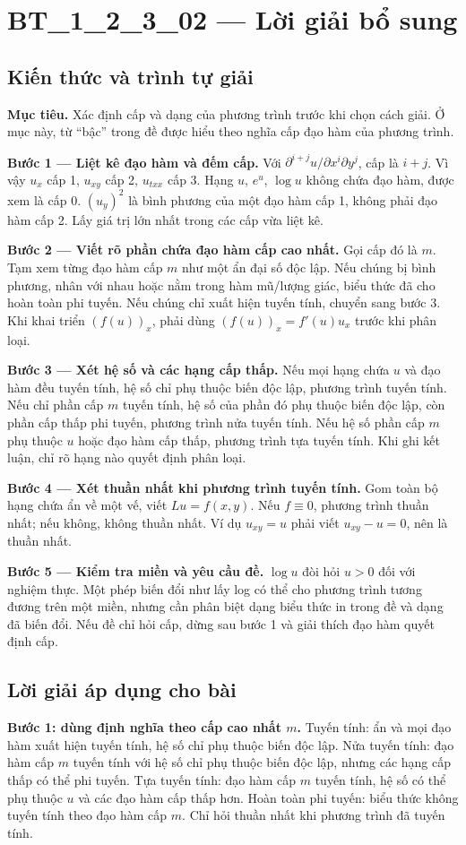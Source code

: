 \documentclass[10pt,a4paper]{article}
\begin{document}
\section*{BT\_1\_2\_3\_02 — Lời giải bổ sung}
\subsection*{Kiến thức và trình tự giải}
\textbf{Mục tiêu.} Xác định cấp và dạng của phương trình trước khi chọn cách giải. Ở mục này, từ “bậc” trong đề được hiểu theo nghĩa cấp đạo hàm của phương trình.

\textbf{Bước 1 — Liệt kê đạo hàm và đếm cấp.} Với $\partial^{i+j}u/\partial x^i\partial y^j$, cấp là $i+j$. Vì vậy $u_x$ cấp 1, $u_{xy}$ cấp 2, $u_{txx}$ cấp 3. Hạng $u$, $e^u$, $\log u$ không chứa đạo hàm, được xem là cấp 0. $(u_y)^2$ là bình phương của một đạo hàm cấp 1, không phải đạo hàm cấp 2. Lấy giá trị lớn nhất trong các cấp vừa liệt kê.

\textbf{Bước 2 — Viết rõ phần chứa đạo hàm cấp cao nhất.} Gọi cấp đó là $m$. Tạm xem từng đạo hàm cấp $m$ như một ẩn đại số độc lập. Nếu chúng bị bình phương, nhân với nhau hoặc nằm trong hàm mũ/lượng giác, biểu thức đã cho hoàn toàn phi tuyến. Nếu chúng chỉ xuất hiện tuyến tính, chuyển sang bước 3. Khi khai triển $(f(u))_x$, phải dùng $(f(u))_x=f'(u)u_x$ trước khi phân loại.

\textbf{Bước 3 — Xét hệ số và các hạng cấp thấp.} Nếu mọi hạng chứa $u$ và đạo hàm đều tuyến tính, hệ số chỉ phụ thuộc biến độc lập, phương trình tuyến tính. Nếu chỉ phần cấp $m$ tuyến tính, hệ số của phần đó phụ thuộc biến độc lập, còn phần cấp thấp phi tuyến, phương trình nửa tuyến tính. Nếu hệ số phần cấp $m$ phụ thuộc $u$ hoặc đạo hàm cấp thấp, phương trình tựa tuyến tính. Khi ghi kết luận, chỉ rõ hạng nào quyết định phân loại.

\textbf{Bước 4 — Xét thuần nhất khi phương trình tuyến tính.} Gom toàn bộ hạng chứa ẩn về một vế, viết $Lu=f(x,y)$. Nếu $f\equiv0$, phương trình thuần nhất; nếu không, không thuần nhất. Ví dụ $u_{xy}=u$ phải viết $u_{xy}-u=0$, nên là thuần nhất.

\textbf{Bước 5 — Kiểm tra miền và yêu cầu đề.} $\log u$ đòi hỏi $u>0$ đối với nghiệm thực. Một phép biến đổi như lấy log có thể cho phương trình tương đương trên một miền, nhưng cần phân biệt dạng biểu thức in trong đề và dạng đã biến đổi. Nếu đề chỉ hỏi cấp, dừng sau bước 1 và giải thích đạo hàm quyết định cấp.
\subsection*{Lời giải áp dụng cho bài}
\textbf{Bước 1: dùng định nghĩa theo cấp cao nhất $m$.} Tuyến tính: ẩn và mọi đạo hàm xuất hiện tuyến tính, hệ số chỉ phụ thuộc biến độc lập. Nửa tuyến tính: đạo hàm cấp $m$ tuyến tính với hệ số chỉ phụ thuộc biến độc lập, nhưng các hạng cấp thấp có thể phi tuyến. Tựa tuyến tính: đạo hàm cấp $m$ tuyến tính, hệ số có thể phụ thuộc $u$ và các đạo hàm cấp thấp hơn. Hoàn toàn phi tuyến: biểu thức không tuyến tính theo đạo hàm cấp $m$. Chỉ hỏi thuần nhất khi phương trình đã tuyến tính.
\end{document}
